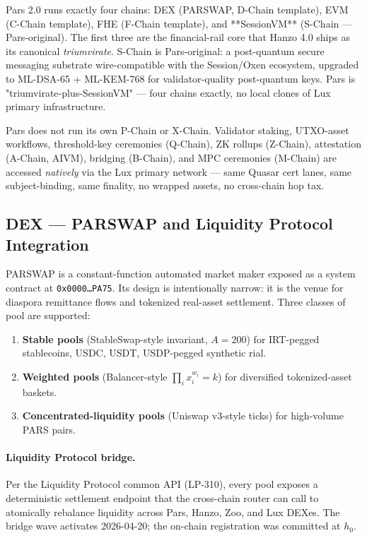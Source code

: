 \documentclass[11pt,a4paper]{article}
\begin{document}
Pars 2.0 runs exactly four chains: DEX (PARSWAP, D-Chain template),
EVM (C-Chain template), FHE (F-Chain template), and **SessionVM**
(S-Chain --- Pars-original). The first three are the financial-rail
core that Hanzo 4.0 ships as its canonical \emph{triumvirate}.
S-Chain is Pars-original: a post-quantum secure messaging substrate
wire-compatible with the Session/Oxen ecosystem, upgraded to
ML-DSA-65 + ML-KEM-768 for validator-quality post-quantum keys.
Pars is "triumvirate-plus-SessionVM" --- four chains exactly, no
local clones of Lux primary infrastructure.

Pars does not run its own P-Chain or X-Chain. Validator staking,
UTXO-asset workflows, threshold-key ceremonies (Q-Chain), ZK
rollups (Z-Chain), attestation (A-Chain, AIVM), bridging
(B-Chain), and MPC ceremonies (M-Chain) are accessed
\emph{natively} via the Lux primary network --- same Quasar cert
lanes, same subject-binding, same finality, no wrapped assets, no
cross-chain hop tax.

\subsection{DEX --- PARSWAP and Liquidity Protocol Integration}

PARSWAP is a constant-function automated market maker exposed as a
system contract at \texttt{0x0000\dots PA75}. Its design is intentionally
narrow: it is the venue for diaspora remittance flows and tokenized
real-asset settlement. Three classes of pool are supported:

\begin{enumerate}[leftmargin=*]
\item \textbf{Stable pools} (StableSwap-style invariant, $A=200$) for
IRT-pegged stablecoins, USDC, USDT, USDP-pegged synthetic rial.
\item \textbf{Weighted pools} (Balancer-style $\prod_i x_i^{w_i}=k$) for
diversified tokenized-asset baskets.
\item \textbf{Concentrated-liquidity pools} (Uniswap v3-style ticks)
for high-volume PARS pairs.
\end{enumerate}

\paragraph{Liquidity Protocol bridge.} Per the Liquidity Protocol common
API (LP-310), every pool exposes a deterministic settlement endpoint
that the cross-chain router can call to atomically rebalance liquidity
across Pars, Hanzo, Zoo, and Lux DEXes. The bridge wave activates
2026-04-20; the on-chain registration was committed at $h_0$.
\end{document}
